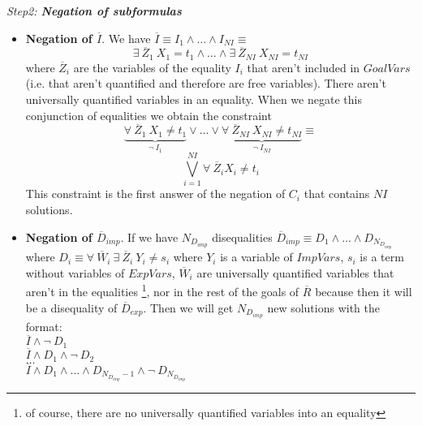 \documentclass{llncs}
\begin{document}
\noindent
{\em Step2: {\bf Negation of subformulas}}

        \begin{itemize}

           \item {\bf Negation of $\overline{I}$}. We have $\overline{I}
           \equiv I_1 \wedge \ldots \wedge I_{NI} \equiv$ \[ \exists~
           \overline{Z}_1~ X_1 = t_1 \wedge \ldots \wedge \exists~
           \overline{Z}_{NI}~ X_{NI} = t_{NI} \] where
           $\overline{Z}_i$ are the variables of the equality $I_i$ that
           aren't included in $GoalVars$ (i.e. that aren't quantified
           and therefore are free variables). There aren't universally
           quantified variables in an equality. When we negate this
           conjunction of equalities we obtain the constraint 
                \[
           \underbrace{\forall~ \overline{Z}_1~ X_1 \neq t_1} _{\neg~
           I_1} \vee \ldots \vee \underbrace{\forall~
           \overline{Z}_{NI}~ X_{NI} \neq t_{NI} } _{\neg~ I_{NI}}
           \equiv \] 
                \[ \bigvee_{i=1}^{NI} \forall~ \overline{Z}_i X_i
           \neq t_i \] 
           This constraint is the first answer of the
           negation of $C_i$ that contains $NI$ solutions.

           \item {\bf Negation of $\overline{D}_{imp}$}. If we have
           $N_{D_{imp}}$ disequalities $\overline{D}_{imp} \equiv D_1
           \wedge \ldots \wedge D_{N_{D_{imp}}}$ where $ D_i \equiv
           \forall~ \overline{W}_i ~ \exists~ \overline{Z}_i ~ Y_i
           \neq s_i$ where $Y_i$ is a variable of $ImpVars$, $s_i$ is
           a term without variables of $ExpVars$, $\overline{W}_i$ are
           universally quantified variables that aren't in the
           equalities \footnote{of course, there are no universally
           quantified variables into an equality}, nor in the rest of
           the goals of $\overline{R}$ because then it will be a
           disequality of $\overline{D}_{exp}$. Then we will get
           $N_{D_{imp}}$ new solutions with the format: \\

           $\overline{I} \wedge \neg~ D_1 $ \\ 
           $\overline{I} \wedge
           D_1 \wedge \neg~ D_2 $ \\ 
           $\ldots $ \\ 
           $\overline{I} \wedge
           D_1 \wedge \ldots \wedge D_{N_{D_{imp}}-1} \wedge \neg~
           D_{N_{D_{imp}}}$ \\ 


\end{itemize}
\end{document}
